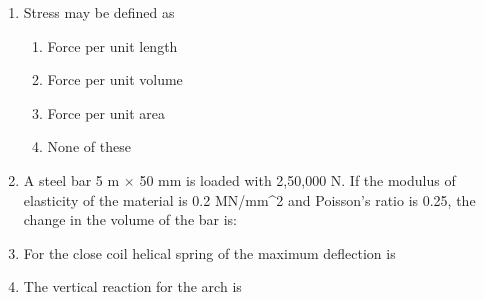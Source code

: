 \documentclass[11pt,a4paper]{article}
\begin{document}
\begin{enumerate}
\item{Stress may be defined as}
\begin{enumerate}[label=\Alph*.]
\item{Force per unit length}
\item{Force per unit volume}
\item{Force per unit area}
\item{None of these }
\end{enumerate}
\item{A steel bar 5 m $\times$ 50 mm is loaded with 2,50,000 N. If the modulus of elasticity of the material is 0.2 MN/mm\^{}2 and Poisson's ratio is 0.25, the change in the volume of the bar is:
}
\\
\item{For the close coil helical spring of the maximum deflection is}
\\
\item{The vertical reaction for the arch is}
\\
\end{enumerate}
\end{document}
